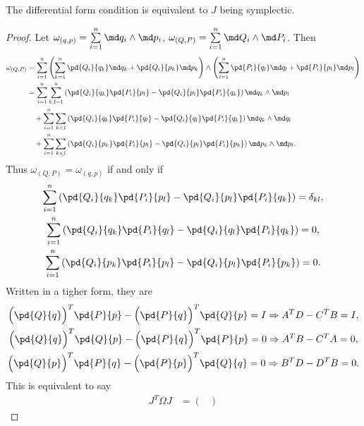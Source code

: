 \begin{theorem}
    The differential form condition is equivalent to $J$ being symplectic.
\end{theorem}
\begin{proof}
    Let $\omega_{(q,p)} = \sum\limits_{i=1}^n \md q_i\wedge \md p_i$,
    $\omega_{(Q,P)} = \sum\limits_{i=1}^n \md Q_i\wedge \md P_i$. Then 
    \begin{align*}
        \omega_{(Q,P)} &= 
        \sum_{i=1}^n\left(\sum_{k=1}^{n}\pd{Q_i}{q_k}\md q_k 
        + \pd{Q_i}{p_k}\md p_k\right) \wedge 
        \left(\sum_{l=1}^{n}\pd{P_i}{q_l}\md q_l 
        + \pd{P_i}{p_l}\md p_l\right) \\ 
        &= \sum_{i=1}^n\sum_{k,l=1}^{n}\left(\pd{Q_i}{q_k}\pd{P_i}{p_l}
        -\pd{Q_i}{p_l}\pd{P_i}{q_k}\right)\md q_k\wedge \md p_l \\
        &\quad + \sum_{i=1}^n\sum_{k<l}\left(\pd{Q_i}{q_k}\pd{P_i}{q_l}
        -\pd{Q_i}{q_l}\pd{P_i}{q_k}\right)\md q_k\wedge \md q_l \\
        &\quad + \sum_{i=1}^n\sum_{k<l}\left(\pd{Q_i}{p_k}\pd{P_i}{p_l}
        -\pd{Q_i}{p_l}\pd{P_i}{p_k}\right)\md p_k\wedge \md p_l.
    \end{align*}
    Thus $\omega_{(Q,P)} = \omega_{(q,p)}$ if and only if 
    \begin{gather*}
        \sum_{i=1}^n\left(\pd{Q_i}{q_k}\pd{P_i}{p_l}
        -\pd{Q_i}{p_l}\pd{P_i}{q_k}\right) = \delta_{kl}, \\
        \sum_{i=1}^n\left(\pd{Q_i}{q_k}\pd{P_i}{q_l}
        -\pd{Q_i}{q_l}\pd{P_i}{q_k}\right) = 0, \\
        \sum_{i=1}^n\left(\pd{Q_i}{p_k}\pd{P_i}{p_l}
        -\pd{Q_i}{p_l}\pd{P_i}{p_k}\right) = 0. 
    \end{gather*}
    Written in a tigher form, they are 
    \begin{gather*}
        \Big(\pd{Q}{q}\Big)^T\pd{P}{p}-\Big(\pd{P}{q}\Big)^T\pd{Q}{p} = I
        \Rightarrow A^{T}D - C^{T}B = I, \\
        \Big(\pd{Q}{q}\Big)^T\pd{Q}{p}-\Big(\pd{P}{q}\Big)^T\pd{P}{p} = 0
        \Rightarrow A^{T}B - C^{T}A = 0, \\
        \Big(\pd{Q}{p}\Big)^T\pd{P}{q}-\Big(\pd{P}{p}\Big)^T\pd{Q}{q} = 0
        \Rightarrow B^{T}D - D^{T}B = 0.
    \end{gather*}
    This is equivalent to say 
    \begin{align*}
        J^T \Omega J &= 
        \begin{pmatrix}

\end{pmatrix}
\end{align*}
\end{proof}
